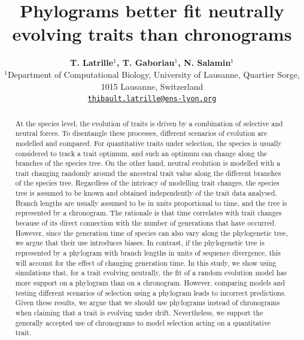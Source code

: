 \documentclass{article}
\title{Phylograms better fit neutrally evolving traits than chronograms}
\author{
\large
\textbf{T. {Latrille}$^{1}$, T. {Gaboriau}$^{1}$, N. {Salamin}$^{1}$}\\
\normalsize
$^{1}$Department of Computational Biology, University of Lausanne, Quartier Sorge, 1015 Lausanne, Switzerland\\
\texttt{\href{mailto:thibault.latrille@ens-lyon.org}{thibault.latrille@ens-lyon.org}} \\
}
\begin{document}
\maketitle

\begin{abstract}
At the species level, the evolution of traits is driven by a combination of selective and neutral forces. To disentangle these processes, different scenarios of evolution are modelled and compared. For quantitative traits under selection, the species is usually considered to track a trait optimum, and such an optimum can change along the branches of the species tree. On the other hand, neutral evolution is modelled with a trait changing randomly around the ancestral trait value along the different branches of the species tree. Regardless of the intricacy of modelling trait changes, the species tree is assumed to be known and obtained independently of the trait data analysed. Branch lengths are usually assumed to be in units proportional to time, and the tree is represented by a chronogram. The rationale is that time correlates with trait changes because of its direct connection with the number of generations that have occurred. However, since the generation time of species can also vary along the phylogenetic tree, we argue that their use introduces biases. In contrast, if the phylogenetic tree is represented by a phylogram with branch lengths in units of sequence divergence, this will account for the effect of changing generation time. In this study, we show using simulations that, for a trait evolving neutrally, the fit of a random evolution model has more support on a phylogram than on a chronogram. However, comparing models and testing different scenarios of selection using a phylogram leads to incorrect predictions. Given these results, we argue that we should use phylograms instead of chronograms when claiming that a trait is evolving under drift. Nevertheless, we support the generally accepted use of chronograms to model selection acting on a quantitative trait.
\end{abstract}


\newpage
\end{document}
